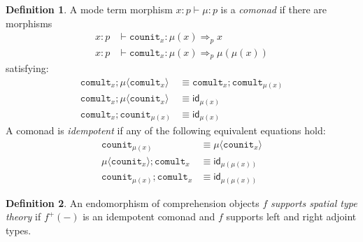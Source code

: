 \documentclass[10pt]{article}
\theoremstyle{definition}
\newtheorem{definition}{Definition}
\newcommand{\yields}{\vdash}
\newcommand{\id}{\mathsf{id}}
\newcommand\TrPlus[2]{\ensuremath{{#1}^+(#2)}}
\newcommand\ap[2]{\ensuremath{#1 \langle #2 \rangle }}
\newcommand\fcomult[1]{\ensuremath{\mathtt{comult}_{#1}}}
\newcommand\fcounit[1]{\ensuremath{\mathtt{counit}_{#1}}}
\begin{document}
\begin{definition}
A mode term morphism $x : p \yields \mu : p$ is a \emph{comonad} if there are morphisms
\begin{align*}
x : p &\yields \fcounit{x} : \mu(x) \Rightarrow_p x \\
x : p &\yields \fcomult{x} : \mu(x) \Rightarrow_p \mu(\mu(x))
\end{align*}
satisfying:
\begin{align}
\fcomult{x};\ap{\mu}{\fcomult{x}} &\equiv \fcomult{x};\fcomult{\mu(x)} \\
\fcomult{x};\ap{\mu}{\fcounit{x}} &\equiv \id_{\mu(x)} \\
\fcomult{x};\fcounit{\mu(x)} &\equiv \id_{\mu(x)}
\end{align}
A comonad is \emph{idempotent} if any of the following equivalent equations hold:
\begin{align}
\fcounit{\mu(x)} &\equiv \ap{\mu}{\fcounit{x}} \\
\ap{\mu}{\fcounit{x}} ; \fcomult{x} &\equiv \id_{\mu(\mu(x))} \\
\fcounit{\mu(x)} ; \fcomult{x} &\equiv \id_{\mu(\mu(x))} 
\end{align}
\end{definition}

\begin{definition}\label{def:supports-spatial}
An endomorphism of comprehension objects $f$ \emph{supports spatial type
  theory} if $\TrPlus{f}{-}$ is an idempotent comonad and $f$ supports
left and right adjoint types.
\end{definition}
\end{document}
